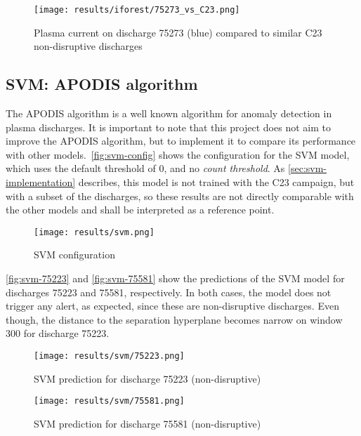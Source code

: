 \begin{figure}[H]
    \centering
    \texttt{[image: results/iforest/75273\_vs\_C23.png]}
    \caption{Plasma current on discharge 75273 (blue) compared to similar C23 non-disruptive discharges}
    \label{fig:iforest-75273-c23}
\end{figure}

\subsection{\acs{SVM}: \acs{APODIS} algorithm}

The \ac{APODIS} algorithm is a well known algorithm for anomaly detection in plasma discharges. It is important to note that this project does not aim to improve the \ac{APODIS} algorithm, but to implement it to compare its performance with other models.\ \autoref{fig:svm-config} shows the configuration for the \ac{SVM} model, which uses the default threshold of 0, and no \textit{count threshold}. As \autoref{sec:svm-implementation} describes, this model is not trained with the C23 campaign, but with a subset of the discharges, so these results are not directly comparable with the other models and shall be interpreted as a reference point.

\begin{figure}[H]
    \centering
    \texttt{[image: results/svm.png]}
    \caption{SVM configuration}
    \label{fig:svm-config}
\end{figure}

\autoref{fig:svm-75223} and \autoref{fig:svm-75581} show the predictions of the \ac{SVM} model for discharges 75223 and 75581, respectively. In both cases, the model does not trigger any alert, as expected, since these are non-disruptive discharges. Even though, the distance to the separation hyperplane becomes narrow on window 300 for discharge 75223. 

\begin{figure}[H]
    \centering
    \texttt{[image: results/svm/75223.png]}
    \caption{SVM prediction for discharge 75223 (non-disruptive)}
    \label{fig:svm-75223}
\end{figure}

\begin{figure}[H]
    \centering
    \texttt{[image: results/svm/75581.png]}
    \caption{SVM prediction for discharge 75581 (non-disruptive)}
    \label{fig:svm-75581}
\end{figure}

